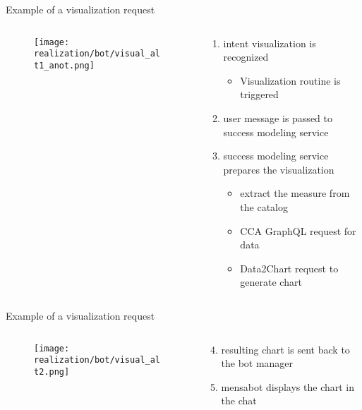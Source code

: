 \begin{frame}{Example of a visualization request}
    
    \begin{columns}
        \begin{column}[t]{0.5\textwidth}
            \begin{figure}
               
                \texttt{[image: realization/bot/visual\_alt1\_anot.png]} 
            \end{figure}
        \end{column}
        \begin{column}[t]{0.5\textwidth}
            \begin{enumerate}
              \item intent visualization is recognized
              \begin{itemize}
                \item Visualization routine is triggered
              \end{itemize}
              \item user message is passed to success modeling service
            \item success modeling service prepares the visualization
            \begin{itemize}
              \item extract the measure from the catalog
              \item CCA GraphQL request for data
              \item Data2Chart request to generate chart
            \end{itemize}
            \end{enumerate}
        \end{column}
    \end{columns}
\end{frame}

\begin{frame}{Example of a visualization request}
  \begin{columns}
    \begin{column}[t]{0.5\textwidth}
      \begin{figure}
        \texttt{[image: realization/bot/visual\_alt2.png]} 
      \end{figure}
    \end{column}
    \begin{column}[t]{0.5\textwidth}
      \begin{enumerate}
        \setcounter{enumi}{3}
        \item resulting chart is sent back to the bot manager
        \item mensabot displays the chart in the chat
      \end{enumerate}
    \end{column}
  \end{columns}
\end{frame}

